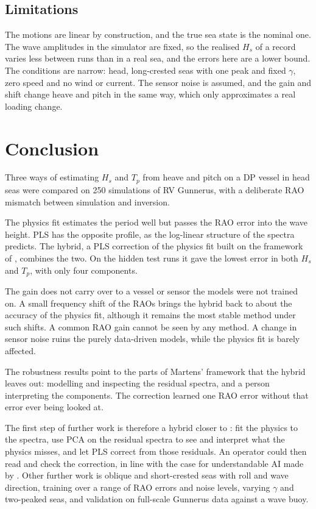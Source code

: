 \documentclass[10pt,a4paper,twocolumn,twoside]{article}
\newcommand{\Hs}{H_{s}}
\newcommand{\Tp}{T_{p}}
\begin{document}
\subsection{Limitations}

The motions are linear by construction, and the true sea state is the nominal one. The wave
amplitudes in the simulator are fixed, so the realised $\Hs$ of a record varies less between runs
than in a real sea, and the errors here are a lower bound. The conditions are narrow: head,
long-crested seas with one peak and fixed $\gamma$, zero speed and no wind or current. The sensor
noise is assumed, and the gain and shift change heave and pitch in the same way, which only
approximates a real loading change.

\section{Conclusion}
\label{sec:conclusion}

Three ways of estimating $\Hs$ and $\Tp$ from heave and pitch on a DP vessel in head seas were
compared on 250 simulations of RV Gunnerus, with a deliberate RAO mismatch between simulation and
inversion.

The physics fit estimates the period well but passes the RAO error into the wave height. PLS has
the opposite profile, as the log-linear structure of the spectra predicts. The hybrid, a PLS
correction of the physics fit built on the framework of \citet{martens2023}, combines the two. On
the hidden test runs it gave the lowest error in both $\Hs$ and $\Tp$, with only four components.

The gain does not carry over to a vessel or sensor the models were not trained on. A small
frequency shift of the RAOs brings the hybrid back to about the accuracy of the physics fit,
although it remains the most stable method under such shifts. A common RAO gain cannot be seen by
any method. A change in sensor noise ruins the purely data-driven models, while the physics fit is
barely affected.

The robustness results point to the parts of Martens' framework that the hybrid leaves out:
modelling and inspecting the residual spectra, and a person interpreting the components. The
correction learned one RAO error without that error ever being looked at.

The first step of further work is therefore a hybrid closer to \citet{martens2023}: fit the physics
to the spectra, use PCA on the residual spectra to see and interpret what the physics misses, and
let PLS correct from those residuals. An operator could then read and check the correction, in line
with the case for understandable AI made by \citet{martens2025}. Other further work is oblique and
short-crested seas with roll and wave direction, training over a range of RAO errors and noise
levels, varying $\gamma$ and two-peaked seas, and validation on full-scale Gunnerus data against a
wave buoy.



\end{document}
